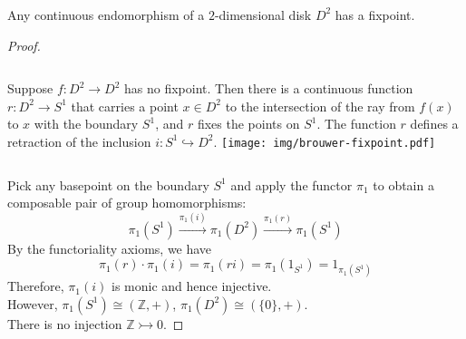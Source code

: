 \documentclass[UTF8,11pt,colorlinks,compress,openany]{beamer}%
\begin{document}
\begin{frame}\frametitle{}
\setlength\abovedisplayskip{0pt}
\setlength\belowdisplayskip{0pt}
\begin{theorem}
	Any continuous endomorphism of a $2$-dimensional disk $D^2$ has a fixpoint.
\end{theorem}
\begin{proof}
\begin{columns}
Suppose $f:D^2\to D^2$ has no fixpoint. Then there is a continuous function $r: D^2\to S^1$ that carries a point $x\in D^2$ to the intersection of the ray from $f(x)$ to $x$ with the boundary $S^1$, and $r$ fixes the points on $S^1$. The function $r$ defines a retraction of the inclusion $i: S^1\hookrightarrow D^2$.
\texttt{[image: img/brouwer-fixpoint.pdf]}
\end{columns}
	Pick any basepoint on the boundary $S^1$ and apply the functor $\pi_1$ to obtain a composable pair of group homomorphisms:
	\[\pi_1(S^1)\xrightarrow{\pi_1(i)}\pi_1(D^2)\xrightarrow{\pi_1(r)}\pi_1(S^1)\]
	By the functoriality axioms, we have
	\[\pi_1(r)\cdot\pi_1(i)=\pi_1(ri)=\pi_1(1_{S^1})=1_{\pi_1(S^1)}\]
	Therefore, $\pi_1(i)$ is monic and hence injective.\\
	However, $\pi_1(S^1)\cong(\mathbb{Z},+)$, $\pi_1(D^2)\cong(\{0\},+)$.\\
	There is no injection $\mathbb{Z}\rightarrowtail 0$.
\end{proof}
\end{frame}
\end{document}
